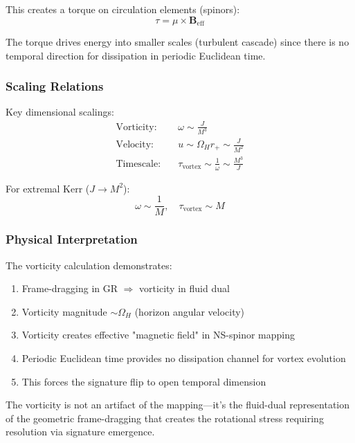 \documentclass[11pt]{article}
\begin{document}
This creates a torque on circulation elements (spinors):
\begin{equation}
\tau = \mu \times \mathbf{B}_{\text{eff}}
\end{equation}

The torque drives energy into smaller scales (turbulent cascade) since there is no temporal direction for dissipation in periodic Euclidean time.

\subsubsection{Scaling Relations}

Key dimensional scalings:
\begin{align}
\text{Vorticity:} \quad &\omega \sim \frac{J}{M^3} \\
\text{Velocity:} \quad &u \sim \Omega_H r_+ \sim \frac{J}{M^2} \\
\text{Timescale:} \quad &\tau_{\text{vortex}} \sim \frac{1}{\omega} \sim \frac{M^3}{J}
\end{align}

For extremal Kerr ($J \to M^2$):
\begin{equation}
\omega \sim \frac{1}{M}, \quad \tau_{\text{vortex}} \sim M
\end{equation}

\subsubsection{Physical Interpretation}

The vorticity calculation demonstrates:
\begin{enumerate}
\item Frame-dragging in GR $\Rightarrow$ vorticity in fluid dual
\item Vorticity magnitude $\sim \Omega_H$ (horizon angular velocity)
\item Vorticity creates effective "magnetic field" in NS-spinor mapping
\item Periodic Euclidean time provides no dissipation channel for vortex evolution
\item This forces the signature flip to open temporal dimension
\end{enumerate}

The vorticity is not an artifact of the mapping—it's the fluid-dual representation of the geometric frame-dragging that creates the rotational stress requiring resolution via signature emergence.
\end{document}
